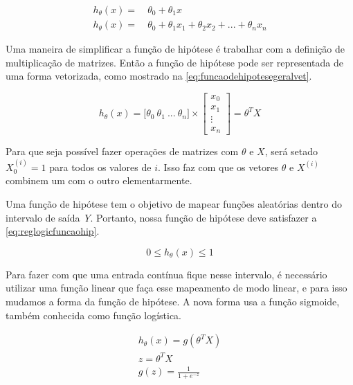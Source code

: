 \begin{align}
h_{\theta}(x) = &\ \theta_0 + \theta_1 x \label{eq:funcaodehipotese} \\
h_{\theta}(x) = &\ \theta_0 + \theta_1 x_1 + \theta_2 x_2 + ... + \theta_n x_n \label{eq:funcaodehipotesegeral}
\end{align}

Uma maneira de simplificar a função de hipótese é trabalhar com a definição de multiplicação de matrizes. Então a função de hipótese pode ser representada de uma forma vetorizada, como mostrado na \autoref{eq:funcaodehipotesegeralvet}.

\begin{equation}
h_{\theta}(x) = \big[\theta_0\ \theta_1\ ...\ \theta_n\big] \times \begin{bmatrix} x_0 \\ x_1 \\ \vdots \\ x_n \end{bmatrix}  = \theta^TX \label{eq:funcaodehipotesegeralvet}
\end{equation}

Para que seja possível fazer operações de matrizes com $\theta$ e $X$, será setado $X_0^{(i)} = 1$ para todos os valores de $i$. Isso faz com que os vetores $\theta$ e $X^{(i)}$ combinem um com o outro elementarmente.

Uma função de hipótese tem o objetivo de mapear funções aleatórias dentro do intervalo de saída \textit{Y}. Portanto, nossa função de hipótese deve satisfazer a \autoref{eq:reglogicfuncaohip}.

\begin{equation}\label{eq:reglogicfuncaohip}
0 \leq h_{\theta}(x) \leq 1
\end{equation}

Para fazer com que uma entrada contínua fique nesse intervalo, é necessário utilizar uma função linear que faça esse mapeamento de modo linear, e para isso mudamos a forma da função de hipótese. A nova forma usa a função sigmoide, também conhecida como função logística.

\begin{align}
h_{\theta}(x) = g(\theta^TX) \nonumber \\
z = \theta^TX \nonumber \\
g(z) = \frac{1}{1 + e^{-z}} \label{eq:funcaosigmoide}
\end{align}

